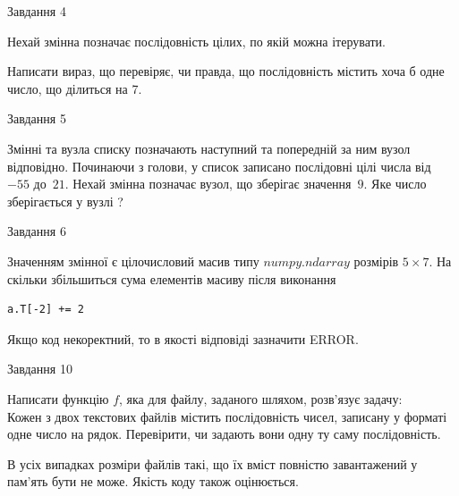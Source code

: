 \documentclass[12pt, ukrainian]{article}
\begin{document}
{\begin{minipage}[t]{8.0cm}
\end{minipage}


               
{\begin{center}Завдання {4}\end{center}}
\vspace{-4mm}
Нехай змінна  позначає послідовність цілих, по якій можна ітерувати.

Написати вираз, що перевіряє, чи правда, що послідовність  містить хоча б одне число, що ділиться на 7.\par

\vspace{10mm}
               
{\begin{center}Завдання {5}\end{center}}
\vspace{-4mm}
Змінні  та  вузла списку позначають наступний та попередній за ним вузол відповідно. Починаючи з голови, у список записано послідовні цілі числа від~$-55$ до~$21$. Нехай змінна  позначає вузол, що зберігає значення~$9$.
Яке число зберігається у вузлі  ?\par

               
{\begin{center}Завдання {6}\end{center}}
\vspace{-4mm}
Значенням змінної  є цілочисловий масив типу $numpy.ndarray$ розмірів $5{\times}7$. На скільки збільшиться сума елементів масиву  після виконання
\begin{verbatim}
a.T[-2] += 2
\end{verbatim}


Якщо код некоректний, то в якості відповіді зазначити ERROR.\par

               
{\begin{center}Завдання {10}\end{center}}
\vspace{-4mm}

Написати функцію $f$, яка для файлу, заданого шляхом, розв’язує задачу:\\ Кожен з двох текстових файлів містить послідовність чисел, записану у форматі одне число на рядок.  Перевірити, чи задають вони одну ту саму послідовність.

В усіх випадках розміри файлів такі, що їх вміст повністю завантажений у пам'ять бути не може. Якість коду також оцінюється.



}
\end{document}
